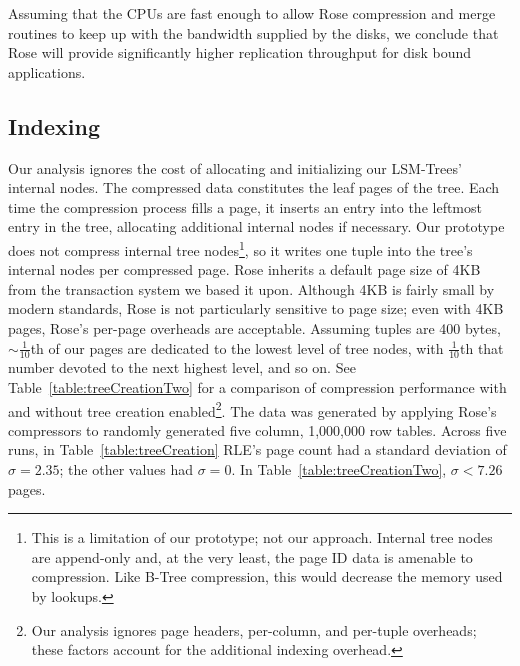 \documentclass{vldb}
\newcommand{\rows}{Rose\xspace}
\newcommand{\rowss}{Rose's\xspace}
\begin{document}
Assuming that the CPUs are fast enough to allow \rows
compression and merge routines to keep up with the bandwidth supplied
by the disks, we conclude that \rows will provide significantly higher
replication throughput for disk bound applications.

\subsection{Indexing}

Our analysis ignores the cost of allocating and initializing our
LSM-Trees' internal nodes.  The compressed data constitutes the leaf
pages of the tree.  Each time the compression process fills a page, it
inserts an entry into the leftmost entry in the tree, allocating
additional internal nodes if necessary.  Our prototype does not compress
internal tree nodes\footnote{This is a limitation of our prototype;
  not our approach.  Internal tree nodes are append-only and, at the
  very least, the page ID data is amenable to compression. Like B-Tree
  compression, this would decrease the memory used by lookups.},
so it writes one tuple into the tree's internal nodes per compressed
page.  \rows inherits a default page size of 4KB from the transaction
system we based it upon.  Although 4KB is fairly small by modern
standards, \rows is not particularly sensitive to page size; even with
4KB pages, \rowss per-page overheads are acceptable.  Assuming tuples
are 400 bytes, $\sim\frac{1}{10}$th of our pages are dedicated to the
lowest level of tree nodes, with $\frac{1}{10}$th that number devoted
to the next highest level, and so on.  See
Table~\ref{table:treeCreationTwo} for a comparison of compression
performance with and without tree creation enabled\footnote{Our
  analysis ignores page headers, per-column, and per-tuple overheads;
  these factors account for the additional indexing overhead.}.  The
data was generated by applying \rowss compressors to randomly
generated five column, 1,000,000 row tables.  Across five runs, in
Table~\ref{table:treeCreation} RLE's page count had a standard
deviation of $\sigma=2.35$; the other values had $\sigma=0$.  In
Table~\ref{table:treeCreationTwo}, $\sigma < 7.26$ pages.

\end{document}
